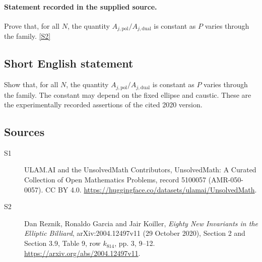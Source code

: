 \documentclass[11pt]{article}
\newcommand{\sref}[2]{\hyperlink{source:#1:#2}{[S#2]}}
\begin{document}
\paragraph{Statement recorded in the supplied source.}
Prove that, for all $N$, the quantity $A_{j,\mathrm{pol}}/A_{j,\mathrm{dual}}$ is constant as $P$ varies through the family. \sref{5100057}{2}
\subsection{Short English statement}
Show that, for all $N$, the quantity $A_{j,\mathrm{pol}}/A_{j,\mathrm{dual}}$ is constant as $P$ varies through the family. The constant may depend on the fixed ellipse and caustic. These are the experimentally recorded assertions of the cited 2020 version.
\subsection{Sources}
\begin{description}
\item[\hypertarget{source:5100057:1}{S1}] ULAM.AI and the UnsolvedMath Contributors, UnsolvedMath: A Curated Collection of Open Mathematics Problems, record 5100057 (AMR-050-0057). CC BY 4.0. \url{https://huggingface.co/datasets/ulamai/UnsolvedMath}.
\item[\hypertarget{source:5100057:2}{S2}] Dan Reznik, Ronaldo Garcia and Jair Koiller, \emph{Eighty New Invariants in the Elliptic Billiard}, arXiv:2004.12497v11 (29 October 2020), Section 2 and Section 3.9, Table 9, row $k_{814}$, pp. 3, 9--12. \url{https://arxiv.org/abs/2004.12497v11}.
\end{description}
\label{end:5100057}
\end{document}

